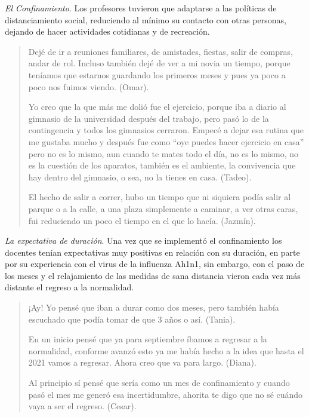 \documentclass[spanish]{textolivre}
\begin{document}
\textit{El Confinamiento}. Los profesores tuvieron que adaptarse a las políticas de distanciamiento social, reduciendo al mínimo su contacto con otras personas, dejando de hacer actividades cotidianas y de recreación.

\begin{quote}
    Dejé de ir a reuniones familiares, de amistades, fiestas, salir de compras, andar de rol. Incluso también dejé de ver a mi novia un tiempo, porque teníamos que estarnos guardando los primeros meses y pues ya poco a poco nos fuimos viendo. (Omar).
    
    Yo creo que la que más me dolió fue el ejercicio, porque iba a diario al gimnasio de la universidad después del trabajo, pero pasó lo de la contingencia y todos los gimnasios cerraron. Empecé a dejar esa rutina que me gustaba mucho y después fue como “oye puedes hacer ejercicio en casa” pero no es lo mismo, aun cuando te mates todo el día, no es lo mismo, no es la cuestión de los aparatos, también es el ambiente, la convivencia que hay dentro del gimnasio, o sea, no la tienes en casa. (Tadeo).
    
    El hecho de salir a correr, hubo un tiempo que ni siquiera podía salir al parque o a la calle, a una plaza simplemente a caminar, a ver otras caras, fui reduciendo un poco el tiempo en el que lo hacía. (Jazmín).
\end{quote}

\textit{La expectativa de duración}. Una vez que se implementó el confinamiento los docentes tenían expectativas muy positivas en relación con su duración, en parte por su experiencia con el virus de la influenza Ah1n1, sin embargo, con el paso de los meses y el relajamiento de las medidas de sana distancia vieron cada vez más distante el regreso a la normalidad.

\begin{quote}
    ¡Ay! Yo pensé que iban a durar como dos meses, pero también había escuchado que podía tomar de que 3 años o así. (Tania).

En un inicio pensé que ya para septiembre íbamos a regresar a la normalidad, conforme avanzó esto ya me había hecho a la idea que hasta el 2021 vamos a regresar. Ahora creo que va para largo. (Diana).

Al principio sí pensé que sería como un mes de confinamiento y cuando pasó el mes me generó esa incertidumbre, ahorita te digo que no sé cuándo vaya a ser el regreso. (Cesar).
\end{quote}
\end{document}

